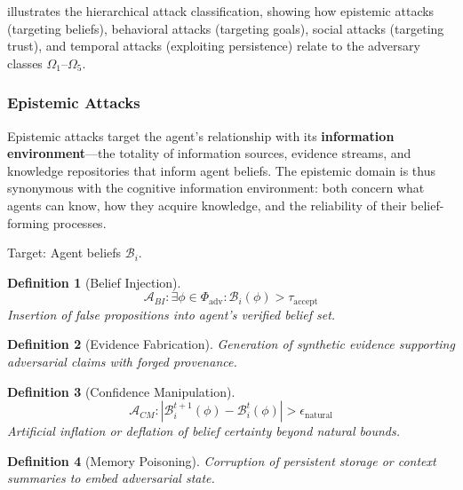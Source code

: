 \documentclass[
]{article}
\newtheorem{definition}{Definition}[section]
\begin{document}
 illustrates the hierarchical attack
classification, showing how epistemic attacks (targeting beliefs),
behavioral attacks (targeting goals), social attacks (targeting trust),
and temporal attacks (exploiting persistence) relate to the adversary
classes \(\Omega_1\)--\(\Omega_5\).

\subsubsection{Epistemic Attacks}\label{epistemic-attacks}

Epistemic attacks target the agent's relationship with its
\textbf{information environment}---the totality of information sources,
evidence streams, and knowledge repositories that inform agent beliefs.
The epistemic domain is thus synonymous with the cognitive information
environment: both concern what agents can know, how they acquire
knowledge, and the reliability of their belief-forming processes.

Target: Agent beliefs \(\mathcal{B}_i\).

\begin{definition}[Belief Injection]
\label{def:belief-injection}
\begin{equation}
\label{eq:belief-injection}
\mathcal{A}_{BI}: \exists \phi \in \Phi_{\text{adv}}: \mathcal{B}_i(\phi) > \tau_{\text{accept}}
\end{equation}
Insertion of false propositions into agent's verified belief set.
\end{definition}

\begin{definition}[Evidence Fabrication]
\label{def:evidence-fab}
Generation of synthetic evidence supporting adversarial claims with forged provenance.
\end{definition}

\begin{definition}[Confidence Manipulation]
\label{def:confidence-manip}
\begin{equation}
\label{eq:confidence-manip}
\mathcal{A}_{CM}: |\mathcal{B}_i^{t+1}(\phi) - \mathcal{B}_i^t(\phi)| > \epsilon_{\text{natural}}
\end{equation}
Artificial inflation or deflation of belief certainty beyond natural bounds.
\end{definition}

\begin{definition}[Memory Poisoning]
\label{def:memory-poison}
Corruption of persistent storage or context summaries to embed adversarial state.
\end{definition}
\end{document}
